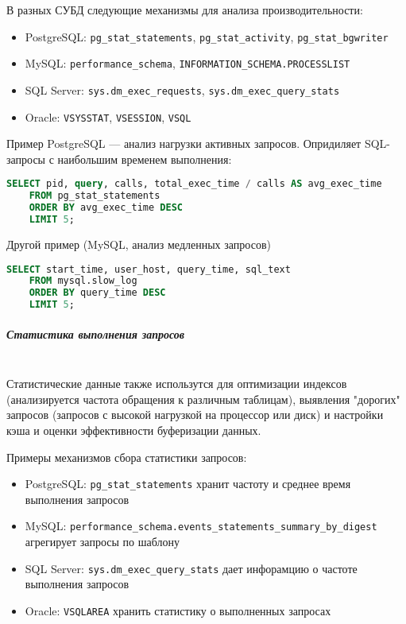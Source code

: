 В разных СУБД следующие механизмы для анализа производительности:
\begin{itemize}
    \item PostgreSQL: \texttt{pg\_stat\_statements}, \texttt{pg\_stat\_activity}, \texttt{pg\_stat\_bgwriter} \autocite[§27.2]{PostgreSQLdocc27}
    \item MySQL: \texttt{performance\_schema}, \texttt{INFORMATION\_SCHEMA.PROCESSLIST} \autocite{Mysqldoc2}
    \item SQL Server: \texttt{sys.dm\_exec\_requests}, \texttt{sys.dm\_exec\_query\_stats} \autocite{MicrosoftLearnSQLserverSysDymView}
    \item Oracle: \texttt{V\textdollar SYSSTAT}, \texttt{V\textdollar SESSION}, \texttt{V\textdollar SQL} \autocite[c. 9 §9.98, §9.17, §9.46]{oracledbdoc2}
\end{itemize}

Пример PostgreSQL — анализ нагрузки активных запросов. Опридиляет SQL-запросы с наибольшим временем выполнения:
\begin{lstlisting}[language=SQL]
    SELECT pid, query, calls, total_exec_time / calls AS avg_exec_time
    FROM pg_stat_statements
    ORDER BY avg_exec_time DESC
    LIMIT 5;        
\end{lstlisting}

Другой пример (MySQL, анализ медленных запросов)
\begin{lstlisting}[language=SQL]
    SELECT start_time, user_host, query_time, sql_text
    FROM mysql.slow_log
    ORDER BY query_time DESC
    LIMIT 5;        
\end{lstlisting}

\subparagraph{Статистика выполнения запросов} ~\\

Статистические данные также использутся для оптимизации индексов (анализируется частота обращения к различным таблицам), выявления "дорогих" запросов (запросов с высокой нагрузкой на процессор или диск) и настройки кэша и оценки эффективности буферизации данных.

Примеры механизмов сбора статистики запросов:
\begin{itemize}
    \item PostgreSQL: \texttt{pg\_stat\_statements} хранит частоту и среднее время выполнения запросов
    \item MySQL: \texttt{performance\_schema.events\_statements\_summary\_by\_digest} агрегирует запросы по шаблону
    \item SQL Server: \texttt{sys.dm\_exec\_query\_stats} дает инфорамцию о частоте выполнения запросов
    \item Oracle: \texttt{V\textdollar SQLAREA} хранить статистику о выполненных запросах
\end{itemize}

